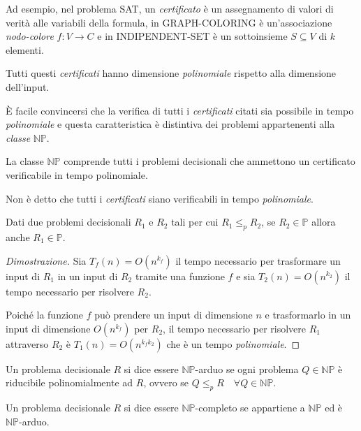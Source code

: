 \noindent
Ad esempio, nel problema SAT, un \emph{certificato} è un assegnamento di
valori di verità alle variabili della formula, in GRAPH-COLORING è un'associazione
\emph{nodo-colore} $f:V\to C$ e in INDIPENDENT-SET è un sottoinsieme $S\subseteq V$
di $k$ elementi.
\begin{note}
    Tutti questi \emph{certificati} hanno dimensione \emph{polinomiale}
    rispetto alla dimensione dell'input.
\end{note}

\noindent
È facile convincersi che la verifica di tutti i \emph{certificati} citati sia
possibile in tempo \emph{polinomiale} e questa caratteristica è distintiva dei
problemi appartenenti alla \emph{classe} $\mathbb{NP}$.

\begin{definition}
    La classe $\mathbb{NP}$ comprende tutti i problemi decisionali che ammettono
    un certificato verificabile in tempo polinomiale.
\end{definition}
\begin{note}
    Non è detto che tutti i \emph{certificati} siano verificabili in tempo
    \emph{polinomiale}.
\end{note}

\begin{definition}
    Dati due problemi decisionali $R_1$ e $R_2$ tali per cui $R_1\leq_p R_2$,
    se $R_2\in\mathbb{P}$ allora anche $R_1\in\mathbb{P}$.
\end{definition}
\begin{proof}[Dimostrazione]
    Sia $T_f(n)=O(n^{k_f})$ il tempo necessario per trasformare un input di $R_1$
    in un input di $R_2$ tramite una funzione $f$ e sia $T_2(n)=O(n^{k_2})$ il
    tempo necessario per risolvere $R_2$.

    Poiché la funzione $f$ può prendere un input di dimensione $n$ e trasformarlo
    in un input di dimensione $O(n^{k_f})$ per $R_2$, il tempo necessario per
    risolvere $R_1$ attraverso $R_2$ è $T_1(n)=O(n^{k_fk_2})$ che è un
    tempo \emph{polinomiale}.
\end{proof}

\begin{definition}
    Un problema decisionale $R$ si dice essere $\mathbb{NP}$-arduo se
    ogni problema $Q\in\mathbb{NP}$ è riducibile polinomialmente ad $R$, ovvero
    se $Q\leq_p R\quad\forall Q\in\mathbb{NP}$.
\end{definition}
\begin{definition}
    Un problema decisionale $R$ si dice essere $\mathbb{NP}$-completo se
    appartiene a $\mathbb{NP}$ ed è $\mathbb{NP}$-arduo.
\end{definition}

